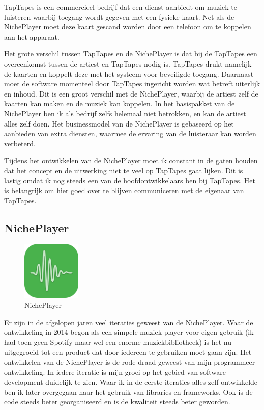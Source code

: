 TapTapes is een commercieel bedrijf dat een dienst aanbiedt om muziek te luisteren waarbij toegang wordt gegeven met een fysieke kaart. Net als de NichePlayer moet deze kaart gescand worden door een telefoon om te koppelen aan het apparaat.

Het grote verschil tussen TapTapes en de NichePlayer is dat bij de TapTapes een overeenkomst tussen de artiest en TapTapes nodig is. TapTapes drukt namelijk de kaarten  en koppelt deze met het systeem voor beveiligde toegang. Daarnaast moet de software momenteel door TapTapes ingericht worden wat betreft uiterlijk en inhoud. Dit is een groot verschil met de NichePlayer, waarbij de artiest zelf de kaarten kan maken en de muziek kan koppelen. In het basispakket van de NichePlayer ben ik als bedrijf zelfs helemaal niet betrokken, en kan de artiest alles zelf doen. Het businessmodel van de NichePlayer is gebaseerd op het aanbieden van extra diensten, waarmee de ervaring van de luisteraar kan worden verbeterd.

Tijdens het ontwikkelen van de NichePlayer moet ik constant in de gaten houden dat het concept en de uitwerking niet te veel op TapTapes gaat lijken. Dit is lastig omdat ik nog steeds een van de hoofdontwikkelaars ben bij TapTapes. Het is belangrijk om hier goed over te blijven communiceren met de eigenaar van TapTapes.

\subsection{NichePlayer}
\begin{figure}
    \centering
    \includegraphics[width=0.25\textwidth]{assets/critical-review/NichePlayer.png}
    \caption{NichePlayer}
    \label{fig:critical-review:NichePlayer}
\end{figure}

Er zijn in de afgelopen jaren veel iteraties geweest van de NichePlayer. Waar de ontwikkeling in 2014 begon als een simpele muziek player voor eigen gebruik (ik had toen geen Spotify maar wel een enorme muziekbibliotheek) is het nu uitgegroeid tot een product dat door iedereen te gebruiken moet gaan zijn. Het ontwikkelen van de NichePlayer is de rode draad geweest van mijn programmeer-ontwikkeling. In iedere iteratie is mijn groei op het gebied van software-development duidelijk te zien. Waar ik in de eerste iteraties alles zelf ontwikkelde ben ik later overgegaan naar het gebruik van libraries en frameworks. Ook is de code steeds beter georganiseerd en is de kwaliteit steeds beter geworden.


